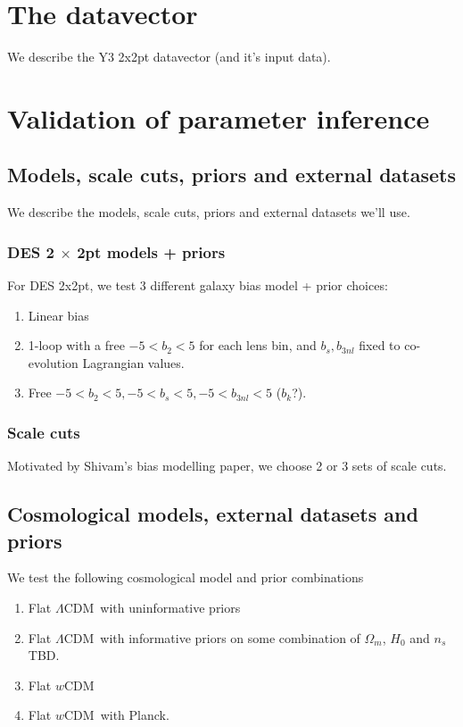 \documentclass[fleqn,usenatbib]{mnras}
\newcommand{\lcdm}{$\Lambda$CDM}
\newcommand{\wcdm}{$w$CDM}
\begin{document}
\section{The datavector}
We describe the Y3 2x2pt datavector (and it's input data).

\section{Validation of parameter inference}

\subsection{Models, scale cuts, priors and external datasets}
We describe the models, scale cuts, priors and external datasets we'll use.

\subsubsection{DES 2 $\times$ 2pt models + priors}
For DES 2x2pt, we test 3 different galaxy bias model + prior choices:
\begin{enumerate}
    \item Linear bias
    \item 1-loop with a free $-5<b_2<5$ for each lens bin, and $b_s, b_{3nl}$ fixed to co-evolution Lagrangian values.
    \item Free $-5<b_2<5, -5<b_s<5, -5<b_{3nl}<5$ ($b_k$?).
\end{enumerate}

\subsubsection{Scale cuts}
Motivated by Shivam's bias modelling paper, we choose 2 or 3 sets of scale cuts.

\subsection{Cosmological models, external datasets and priors}
We test the following cosmological model and prior combinations
\begin{enumerate}
    \item Flat \lcdm\ with uninformative priors
    \item Flat \lcdm\ with informative priors on some combination of $\Omega_m$, $H_0$ and $n_s$ TBD.
    \item Flat \wcdm 
    \item Flat \wcdm\ with Planck.
\end{enumerate}
\end{document}
